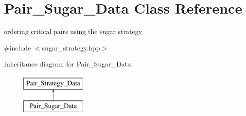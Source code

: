 \hypertarget{class_pair___sugar___data}{}\section{Pair\+\_\+\+Sugar\+\_\+\+Data Class Reference}
\label{class_pair___sugar___data}


ordering critical pairs using the sugar strategy  




{\ttfamily \#include $<$sugar\+\_\+strategy.\+hpp$>$}

Inheritance diagram for Pair\+\_\+\+Sugar\+\_\+\+Data\+:\begin{figure}[H]
\begin{center}
\leavevmode
\includegraphics[height=2.000000cm]{class_pair___sugar___data}
\end{center}
\end{figure}
